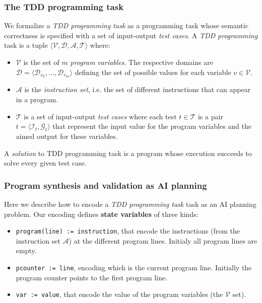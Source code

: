 \documentclass[10pt,a4paper]{paper}
\newcommand{\tup}[1]{{\langle #1 \rangle}}
\begin{document}
\subsubsection{The TDD programming task}
We formalize a {\em TDD programming task} as a programming task whose semantic correctness is specified with a set of input-output {\em test cases}. A {\em TDD programming} task is a tuple $\tup{{\mathcal V},{\mathcal D},{\mathcal A}, {\mathcal T}}$ where:
\begin{itemize}
\item ${\mathcal V}$ is the set of $m$ {\em program variables}. The respective domains are ${\mathcal D}=\tup{{\mathcal D}_{v_0}, \ldots, {\mathcal D}_{v_m}}$ defining the set of possible values for each variable $v\in {\mathcal V}$.
\item ${\mathcal A}$ is the {\em instruction set}, i.e. the set of different instructions that can appear in a program.
\item ${\mathcal T}$ is a set of input-output {\em test cases} where each test $t\in {\mathcal T}$ is a pair $t=\tup{{\mathcal I}_t,{\mathcal G}_t}$ that represent the input value for the program variables and the aimed output for these variables.
\end{itemize}
A {\em solution} to TDD programming task is a program whose execution succeeds to solve every given test case.  

\subsubsection{Program synthesis and validation as AI planning}
Here we describe how to encode a {\em TDD programming task} task as an AI planning problem. Our encoding defines {\bf state variables} of three kinds:
\begin{itemize}
\item {\tt program(line) := instruction}, that encode the instructions (from the instruction set ${\mathcal A}$) at the different program lines. Initialy all program lines are empty.
\item {\tt pcounter := line}, encoding which is the current program line. Initially the program counter points to the first program line.
\item {\tt var := value}, that encode the value of the program variables (the ${\mathcal V}$ set).
\end {itemize}
\end{document}

